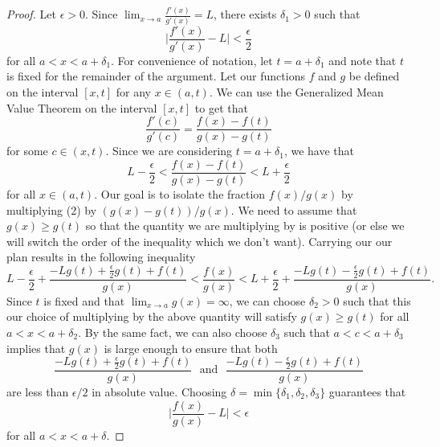 \begin{proof}
Let \( \epsilon > 0  \). Since \( \lim_{ x \to a } \frac{ f'(x)  }{ g'(x)  } = L  \), there exists \( \delta_1 > 0  \) such that 
\[   \Big| \frac{ f'(x)  }{ g'(x) } - L  \Big| < \frac{ \epsilon  }{ 2 } \tag{1} \]
for all \( a < x < a + \delta_1  \). For convenience of notation, let \( t = a + \delta_1  \) and note that \( t  \) is fixed for the remainder of the argument. Let our functions \( f  \) and \( g  \) be defined on the interval \( [x,t] \) for any \( x \in (a,t)  \). We can use the Generalized Mean Value Theorem on the interval \( [x,t]  \) to get that 
\[  \frac{ f'(c)  }{ g'(c)  } = \frac{ f(x) - f(t)  }{ g(x) - g(t)  }  \] for some \( c \in (x,t ) \). Since we are considering \( t = a + \delta_1  \), we have that 
\[  L - \frac{ \epsilon  }{ 2 } < \frac{ f(x) - f(t)  }{ g(x) - g(t) } < L + \frac{ \epsilon  }{ 2 } \tag{2}  \] for all \( x \in (a,t). \) 
Our goal is to isolate the fraction \( f(x) / g(x)  \) by multiplying (2) by \( (g(x) - g(t)) / g(x)  \). We need to assume that \( g(x) \geq g(t)  \) so that the quantity we are multiplying by is positive (or else we will switch the order of the inequality which we don't want). Carrying our our plan results in the following inequality
\[  L - \frac{ \epsilon  }{ 2 }  + \frac{ -Lg(t) + \frac{ \epsilon  }{ 2 } g(t) + f(t)  }{ g(x)  } < \frac{ f(x)  }{ g(x)  } < L + \frac{ \epsilon  }{ 2 } + \frac{ -L g(t) - \frac{ \epsilon  }{ 2 } g(t)  + f(t)  }{ g(x)  }.\]
Since \( t  \) is fixed and that \( \lim_{ x \to a } g(x) = \infty  \), we can choose \( \delta_2 > 0  \) such that this our choice of multiplying by the above quantity will satisfy \( g(x) \geq g(t)  \) for all \( a < x < a + \delta_2 \). By the same fact, we can also choose \( \delta_3  \) such that \( a < c < a + \delta_3  \) implies that \( g(x)  \) is large enough to ensure that both 
\[ \frac{ -Lg(t) + \frac{ \epsilon }{ 2 } g(t) + f(t)   }{ g(x)  } \text{ ~and~ } \frac{ -L g(t) - \frac{ \epsilon  }{ 2 } g(t) + f(t)   }{ g(x)  } \]
are less than  \( \epsilon / 2   \) in absolute value. Choosing \( \delta = \min \{ \delta_1, \delta_2, \delta_3  \}  \) guarantees that 
\[  \Big| \frac{ f(x)  }{ g(x)  } - L  \Big| < \epsilon \]
for all \( a < x < a  + \delta. \)
\end{proof}

